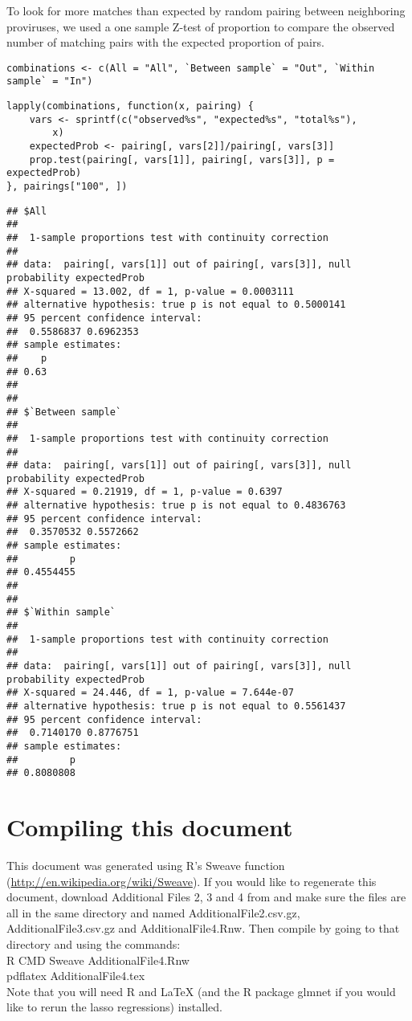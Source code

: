 \documentclass[../../sherrill-Mix_thesis.tex]{subfiles}
\makeatletter
\newenvironment{kframe}{%
 \def\at@end@of@kframe{}%
 \ifinner\ifhmode%
  \def\at@end@of@kframe{\end{minipage}}%
  \begin{minipage}{\columnwidth}%
 \fi\fi%
 \def\FrameCommand##1{\hskip\@totalleftmargin \hskip-\fboxsep
 \colorbox{shadecolor}{##1}\hskip-\fboxsep
     \hskip-\linewidth \hskip-\@totalleftmargin \hskip\columnwidth}%
 \MakeFramed {\advance\hsize-\width
   \@totalleftmargin\z@ \linewidth\hsize
   \@setminipage}}%
 {\par\unskip\endMakeFramed%
 \at@end@of@kframe}
\newenvironment{knitrout}{}{} %
\makeatother
\begin{document}
To look for more matches than expected by random pairing between neighboring proviruses, we used a one sample Z-test of proportion to compare the observed number of matching pairs with the expected proportion of pairs.
\begin{knitrout}
\color{fgcolor}\begin{kframe}
\begin{lstlisting}[basicstyle=\ttfamily,breaklines=true]
combinations <- c(All = "All", `Between sample` = "Out", `Within sample` = "In")\end{lstlisting}
\begin{lstlisting}[basicstyle=\ttfamily,breaklines=true]
lapply(combinations, function(x, pairing) {
    vars <- sprintf(c("observed%s", "expected%s", "total%s"), 
        x)
    expectedProb <- pairing[, vars[2]]/pairing[, vars[3]]
    prop.test(pairing[, vars[1]], pairing[, vars[3]], p = expectedProb)
}, pairings["100", ])\end{lstlisting}
\begin{lstlisting}[basicstyle=\ttfamily,breaklines=true]
## $All
## 
## 	1-sample proportions test with continuity correction
## 
## data:  pairing[, vars[1]] out of pairing[, vars[3]], null probability expectedProb
## X-squared = 13.002, df = 1, p-value = 0.0003111
## alternative hypothesis: true p is not equal to 0.5000141
## 95 percent confidence interval:
##  0.5586837 0.6962353
## sample estimates:
##    p 
## 0.63 
## 
## 
## $`Between sample`
## 
## 	1-sample proportions test with continuity correction
## 
## data:  pairing[, vars[1]] out of pairing[, vars[3]], null probability expectedProb
## X-squared = 0.21919, df = 1, p-value = 0.6397
## alternative hypothesis: true p is not equal to 0.4836763
## 95 percent confidence interval:
##  0.3570532 0.5572662
## sample estimates:
##         p 
## 0.4554455 
## 
## 
## $`Within sample`
## 
## 	1-sample proportions test with continuity correction
## 
## data:  pairing[, vars[1]] out of pairing[, vars[3]], null probability expectedProb
## X-squared = 24.446, df = 1, p-value = 7.644e-07
## alternative hypothesis: true p is not equal to 0.5561437
## 95 percent confidence interval:
##  0.7140170 0.8776751
## sample estimates:
##         p 
## 0.8080808
\end{lstlisting}
\end{kframe}
\end{knitrout}
\section{Compiling this document}
This document was generated using R's Sweave function (\url{http://en.wikipedia.org/wiki/Sweave}). If you would like to regenerate this document, download Additional Files 2, 3 and 4 from \citet{Sherrill-Mix2013} and make sure the files are all in the same directory and named AdditionalFile2.csv.gz, AdditionalFile3.csv.gz and AdditionalFile4.Rnw. Then compile by going to that directory and using the commands:\\
R CMD Sweave AdditionalFile4.Rnw\\
pdflatex AdditionalFile4.tex\\

Note that you will need R and \LaTeX{} (and the R package glmnet if you would like to rerun the lasso regressions) installed.
\end{document}
